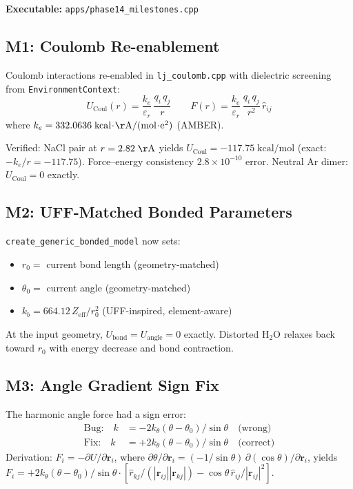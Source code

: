 \documentclass[11pt]{article}
\begin{document}
\textbf{Executable:} \texttt{apps/phase14\_milestones.cpp}

\subsection{M1: Coulomb Re-enablement}

Coulomb interactions re-enabled in \texttt{lj\_coulomb.cpp} with dielectric
screening from \texttt{EnvironmentContext}:
\[
    U_{\mathrm{Coul}}(r) = \frac{k_e}{\varepsilon_r}\,\frac{q_i\,q_j}{r}
    \qquad
    F(r) = \frac{k_e}{\varepsilon_r}\,\frac{q_i\,q_j}{r^2}\,\hat{r}_{ij}
\]
where $k_e = 332.0636\;\mathrm{kcal\!\cdot\!\AA/(mol\!\cdot\!e^2)}$ (AMBER).

Verified: NaCl pair at $r = 2.82\;\mathrm{\AA}$ yields
$U_{\mathrm{Coul}} = -117.75\;\mathrm{kcal/mol}$ (exact: $-k_e/r = -117.75$).
Force--energy consistency $2.8 \times 10^{-10}$ error.
Neutral Ar dimer: $U_{\mathrm{Coul}} = 0$ exactly.

\subsection{M2: UFF-Matched Bonded Parameters}

\texttt{create\_generic\_bonded\_model} now sets:
\begin{itemize}
\item $r_0 = $ current bond length (geometry-matched)
\item $\theta_0 = $ current angle (geometry-matched)
\item $k_b = 664.12\,Z_{\mathrm{eff}}/r_0^2$ (UFF-inspired, element-aware)
\end{itemize}

At the input geometry, $U_{\mathrm{bond}} = U_{\mathrm{angle}} = 0$ exactly.
Distorted H$_2$O relaxes back toward $r_0$ with energy decrease and bond
contraction.

\subsection{M3: Angle Gradient Sign Fix}

The harmonic angle force had a sign error:
\begin{align*}
    \text{Bug:} \quad k &= -2k_\theta(\theta-\theta_0)/\sin\theta \quad\text{(wrong)} \\
    \text{Fix:} \quad k &= +2k_\theta(\theta-\theta_0)/\sin\theta \quad\text{(correct)}
\end{align*}
Derivation: $F_i = -\partial U/\partial\mathbf{r}_i$, where
$\partial\theta/\partial\mathbf{r}_i = (-1/\sin\theta)\,\partial(\cos\theta)/\partial\mathbf{r}_i$,
yields $F_i = +2k_\theta(\theta-\theta_0)/\sin\theta \cdot [\hat{r}_{kj}/(|\mathbf{r}_{ij}||\mathbf{r}_{kj}|) - \cos\theta\,\hat{r}_{ij}/|\mathbf{r}_{ij}|^2]$.
\end{document}
